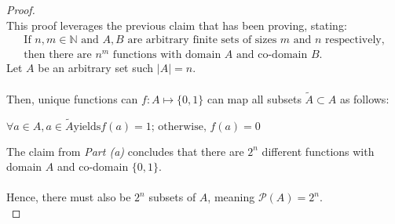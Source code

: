 \documentclass[12pt]{article}
\begin{document}
\begin{proof}
\leavevmode\\
    This proof leverages the previous claim that has been proving, stating:
    \begin{equation}
        \begin{aligned}
            \text{If $n, m \in \mathbb{N}$ and $A, B$ are arbitrary finite sets of sizes $m$ and $n$ respectively,} \\
            \text{then there are $n^m$ functions with domain $A$ and co-domain $B$.}
        \end{aligned}
    \end{equation}
    Let $A$ be an arbitrary set such $|A| = n$. \\
    \\
    Then, unique functions can $f: A \mapsto \{0, 1\}$ can map all subsets $\widetilde{A} \subset A$ as follows: \\
    \begin{center}
        $\forall a \in A, a \in \widetilde{A} \text{yields} f(a) = 1\text{; otherwise, } f(a) = 0$
    \end{center}
    The claim from \textit{Part (a)} concludes that there are $2^n$ different functions with domain $A$ and co-domain $\{0, 1\}$. \\
    \\
    Hence, there must also be $2^n$ subsets of $A$, meaning $\mathcal{P}(A) = 2^n$. \\
\end{proof}
\end{document}
